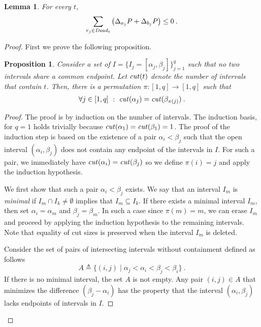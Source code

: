 \documentclass[11pt]{article}
\newenvironment{proof sketch}[1]{\noindent {\emph{Proof sketch of #1:}}}{\hfill \qed}
\newtheorem{proposition}{Proposition}
\newtheorem{lemma}{Lemma}
\newcommand{\eqdf}{\triangleq}
\newcommand{\PRaj}{\Delta_{a_j} P}
\newcommand{\PRbj}{\Delta_{b_j} P}
\newcommand{\dead}{\text{\textit{Dead}}}
\newcommand{\cut}{\text{\textit{cut}}}
\begin{document}
\begin{lemma}\label{eqn:np}
    For every $t$,
    \begin{align}
      \sum_{r_j \in \dead_t}\left(\PRaj +\PRbj \right) \leq 0\:. \label{eqn:canceling}
    \end{align}
\end{lemma}
\begin{proof}
    First we prove the following proposition.
    \begin{proposition}\label{prop:intervals}
      Consider a set of $I=\{I_j=[\alpha_j,\beta_j]\}_{j=1}^q$ such that no
      two intervals share a common endpoint.  Let $\cut(t)$ denote the number of intervals that contain $t$.
    Then, there is a  permutation $\pi:[1,q] \rightarrow [1,q]$ such that
    \begin{align}
        \forall j\in [1,q]~:~\cut(\alpha_j) = \cut(\beta_{\pi(j)})\:.\label{eqn:mapping}
    \end{align}
    \end{proposition}
    \begin{proof}
      The proof is by induction on the number of intervals.  The induction basis,
      for $q=1$ holds trivially because $\cut(\alpha_1) = \cut(\beta_1)=1$.
      The proof of the induction step is based on the existence of a
      pair $\alpha_i<\beta_j$ such that the open interval $(\alpha_i,\beta_j)$ does not
      contain any endpoint of the intervals in $I$. For such a pair,
      we immediately have $\cut(\alpha_i)=\cut(\beta_j)$ so we define
      $\pi(i)=j$ and apply the induction hypothesis.

      We first show that such a pair $\alpha_i<\beta_j$ exists.  We say that an
      interval $I_m$ is \emph{minimal} if $I_m \cap I_k \neq
      \emptyset$ implies that $I_m \subseteq I_k$.  If there exists a
      minimal interval $I_m$, then set $\alpha_i=\alpha_{m}$ and $\beta_j=\beta_{m}$. In
      such a case since $\pi(m)=m$, we can erase $I_m$ and proceed by
      applying the induction hypothesis to the remaining intervals. Note that equality of cut sizes is preserved when the interval $I_m$ is deleted.

      Consider the set of pairs of
      intersecting intervals without containment defined as follows
\[
A \eqdf \{ (i,j) \mid \alpha_j<\alpha_i<\beta_j<\beta_i\}\:.
\]
If there is no minimal interval, the set $A$ is not empty.
Any pair $(i,j)\in A$ that minimizes the difference $(\beta_j-\alpha_i)$ has the property
that the interval $(\alpha_i,\beta_j)$ lacks endpoints of intervals in $I$.


\end{proof}
\end{proof}
\end{document}
